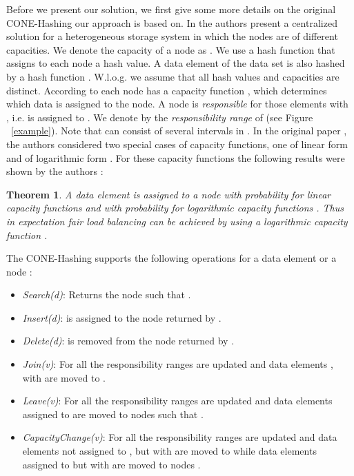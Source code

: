 \documentclass[11pt]{article}
\newtheorem{theorem}{Theorem}[section]
\begin{document}
Before we present our solution, we
first give some more details on the original CONE-Hashing \cite{cone} our
approach is based on. In \cite{cone} the authors present a centralized
solution for a heterogeneous storage system in which the nodes are of
different capacities. We denote the  capacity of a node  as . We use
a hash function  that assigns to each node a hash value. A
data element of the data set  is also hashed by a hash function . W.l.o.g. we assume that all hash values and capacities are
distinct.  According to \cite{cone} each node has a capacity function
, which determines which data is assigned to the node. A node is
\emph{responsible} for those elements  with , i.e.  is assigned to . We denote by  the \emph{responsibility range} of
  (see Figure ~\ref{example}). Note that  can consist of several intervals in .
In the original paper \cite{cone}, the authors considered two special cases
of capacity functions, one of linear form
 and of logarithmic form
. For these capacity
functions the following results were shown by the authors \cite{cone}:

\begin{theorem}\label{theo:coneOriginal1}
A data element  is assigned to a node  with probability
 for linear capacity functions
 and with probability  for logarithmic capacity functions . Thus in expectation fair load balancing can be achieved by using a logarithmic
capacity function .
\end{theorem}

The CONE-Hashing supports the following operations for a data element  or
a node :

\begin{itemize}\itemsep0.1pt
        \item \emph{Search(d)}: Returns the node  such that .
        \item \emph{Insert(d)}:  is assigned to  the node returned by .
        \item \emph{Delete(d)}:  is removed from the node returned by .
        \item \emph{Join(v)}: For all  the responsibility ranges
 are updated and data elements , with  are moved
to .
        \item \emph{Leave(v)}: For all  the responsibility ranges
 are updated and data elements  assigned to  are moved to nodes
 such that .
        \item \emph{CapacityChange(v)}: For all  the responsibility
ranges  are updated and data elements  not assigned to , but with  are moved to  while data elements  assigned to 
but with  are moved to nodes .
\end{itemize}
\end{document}
